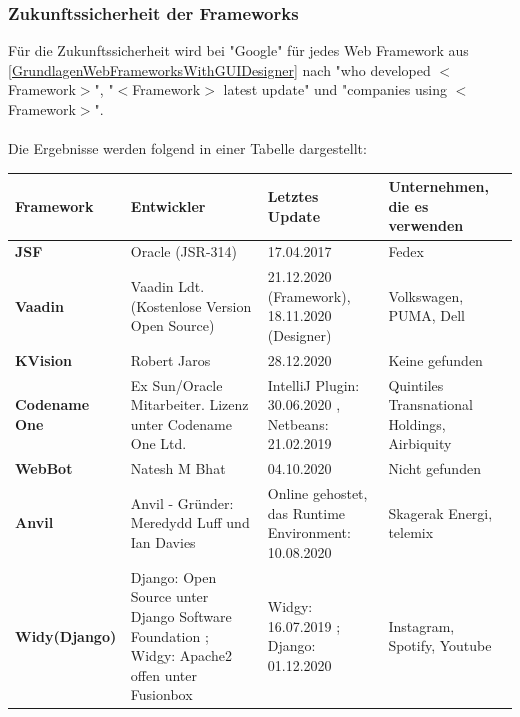 \documentclass[ngerman]{article}
\begin{document}
    \subsubsection{Zukunftssicherheit der Frameworks}
    \label{GrundlagenZukunftssicherheitFramework}
    Für die Zukunftssicherheit wird bei "Google" für jedes Web Framework aus \ref{GrundlagenWebFrameworksWithGUIDesigner} nach "who developed $<$Framework$>$", "$<$Framework$>$ latest update" und "companies using $<$Framework$>$".\\\\
    Die Ergebnisse werden folgend in einer Tabelle dargestellt:\\
    \begin{tabularx}{1.15\textwidth}{|l|X|X|X|}
        \hline
        \textbf{Framework}&\textbf{Entwickler}&\textbf{Letztes Update}&\textbf{Unternehmen, die es verwenden}\\
        \hline
        \textbf{JSF}&Oracle (JSR-314) \cite{JSFDeveloper}&17.04.2017 \cite{JSFLatestUpdate}&Fedex \cite{JSFCompaniesUsing}\\
        \hline
        \textbf{Vaadin}&Vaadin Ldt. (Kostenlose Version Open Source) \cite{VaadinDeveloper}&21.12.2020 (Framework), 18.11.2020 (Designer) \cite{VaadinReleases}&Volkswagen, PUMA, Dell \cite{VaadinCompanies}\\
        \hline
        \textbf{KVision}&Robert Jaros \cite{KVisionDeveloper}&28.12.2020 \cite{KVisionReleases}&Keine gefunden\\
        \hline
        \textbf{Codename One}&Ex Sun/Oracle Mitarbeiter. Lizenz unter Codename One Ltd. \cite{CodenameOneDeveloper}&IntelliJ Plugin: 30.06.2020 \cite{CodenameOneReleases1}, Netbeans: 21.02.2019 \cite{CodenameOneReleases2}&Quintiles Transnational Holdings, Airbiquity \cite{CodenameOneCompanies}\\
        \hline
        \textbf{WebBot}&Natesh M Bhat \cite{WebBotDeveloper}&04.10.2020 \cite{WebBotReleases}&Nicht gefunden\\
        \hline
        \textbf{Anvil}&Anvil - Gründer: Meredydd Luff und Ian Davies \cite{AnvilDeveloper}&Online gehostet, das Runtime Environment: 10.08.2020 \cite{AnvilReleases}&Skagerak Energi, telemix \cite{AnvilCompanies}\\
        \hline
        \textbf{Widy(Django)}&Django: Open Source unter Django Software Foundation \cite{DjangoDeveloper}; Widgy: Apache2 offen unter Fusionbox \cite{WidgyDeveloper}&Widgy: 16.07.2019 \cite{WidgyReleases}; Django: 01.12.2020 \cite{DjangoReleases}&Instagram, Spotify, Youtube \cite{DjangoCompanies}\\

\end{tabularx}
\end{document}
